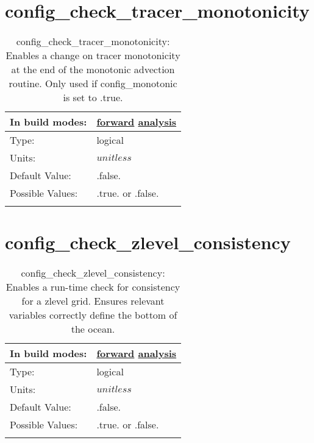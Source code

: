 \section[config\_check\_tracer\_monotonicity]{config\_check\_tracer\_monotonicity}
\label{sec:nm_sec_config_check_tracer_monotonicity}
\begin{center}
\begin{longtable}{| p{2.0in} || p{4.0in} |}
    \hline
    In build modes: & \hyperref[subsec:forward_nm_tab_debug]{forward} \hyperref[subsec:analysis_nm_tab_debug]{analysis} \\
    \hline
    Type: & logical \\
    \hline
    Units: & $unitless$ \\
    \hline
    Default Value: & .false. \\
    \hline
    Possible Values: & .true. or .false. \\
    \hline
    \caption{config\_check\_tracer\_monotonicity: Enables a change on tracer monotonicity at the end of the monotonic advection routine. Only used if config\_monotonic is set to .true.}
\end{longtable}
\end{center}
\section[config\_check\_zlevel\_consistency]{config\_check\_zlevel\_consistency}
\label{sec:nm_sec_config_check_zlevel_consistency}
\begin{center}
\begin{longtable}{| p{2.0in} || p{4.0in} |}
    \hline
    In build modes: & \hyperref[subsec:forward_nm_tab_debug]{forward} \hyperref[subsec:analysis_nm_tab_debug]{analysis} \\
    \hline
    Type: & logical \\
    \hline
    Units: & $unitless$ \\
    \hline
    Default Value: & .false. \\
    \hline
    Possible Values: & .true. or .false. \\
    \hline
    \caption{config\_check\_zlevel\_consistency: Enables a run-time check for consistency for a zlevel grid. Ensures relevant variables correctly define the bottom of the ocean.}
\end{longtable}
\end{center}

